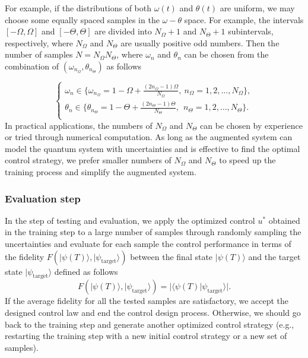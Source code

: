 \documentclass[letterpaper, 10 pt, conference]{ieeeconf}
\begin{document}
For example, if the distributions of both $\omega(t)$ and $\theta(t)$
are uniform, we may choose some equally spaced samples in the
$\omega-\theta$ space. For example, the intervals $[-\Omega,
\Omega]$ and $[-\Theta, \Theta]$ are divided into
$N_{\Omega}+1$ and $N_{\Theta}+1$ subintervals, respectively,
where $N_{\Omega}$ and $N_{\Theta}$ are usually positive odd
numbers. Then the number of samples $N=N_{\Omega}N_{\Theta}$,
where $\omega_{n}$ and $\theta_{n}$ can be chosen from the
combination of $(\omega_{n_{\Omega}}, \theta_{n_{\Theta}})$ as
follows

\begin{equation}\label{discrete}
\left\{ \begin{array}{c} \omega_{n} \in
\{\omega_{n_{\Omega}}=1-\Omega+\frac{(2n_{\Omega}-1)\Omega}{N_{\Omega}},
\ n_{\Omega}=1,2,\ldots, N_{\Omega}\},\\
\theta_{n} \in
\{\theta_{n_{\Theta}}=1-\Theta+\frac{(2n_{\Theta}-1)\Theta}{N_{\Theta}},\
\
n_{\Theta}=1,2,\ldots, N_{\Theta}\}. \\
\end{array}
\right.
\end{equation}
In practical applications, the numbers of $N_{\Omega}$ and
$N_{\Theta}$ can be chosen by experience or tried through
numerical computation. As long as the augmented system can model
the quantum system with uncertainties and is effective to find the optimal control
strategy, we prefer smaller numbers of $N_{\Omega}$ and
$N_{\Theta}$ to speed up the training process and simplify the
augmented system.

\subsubsection{Evaluation step}
In the step of testing and evaluation, we apply the optimized
control $u^{*}$ obtained in the training step to a large number of
samples through randomly sampling the uncertainties
and evaluate for each sample the control performance in terms of
the fidelity $F(|\psi(T)\rangle,|\psi_{\text{target}}\rangle)$ between the final state
$|\psi(T)\rangle$ and the target state
$|\psi_{\text{target}}\rangle$ defined as follows \cite{Nielsen
and Chuang 2000}
\begin{equation}\label{fidelity}
F(|\psi(T)\rangle,|\psi_{\text{target}}\rangle)=|\langle \psi(T)|\psi_{\text{target}}\rangle| .
\end{equation}
If the average fidelity for all the
tested samples are satisfactory, we accept the designed control
law and end the control design process. Otherwise, we should go
back to the training step and generate another optimized control
strategy (e.g., restarting the training step with a new initial
control strategy or a new set of samples).
\end{document}
